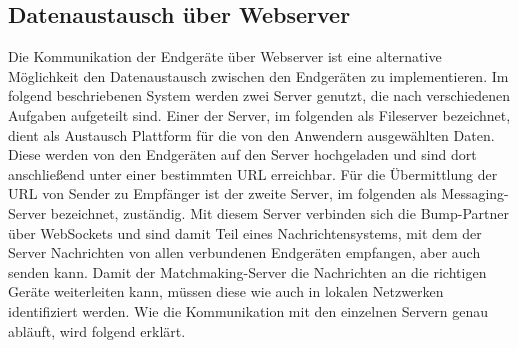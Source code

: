 \subsection{Datenaustausch über Webserver}
\label{sec:AustauschWebserver}

Die Kommunikation der Endgeräte über Webserver ist eine alternative Möglichkeit den Datenaustausch zwischen den Endgeräten zu implementieren. Im folgend beschriebenen System werden zwei Server genutzt, die nach verschiedenen Aufgaben aufgeteilt sind. Einer der Server, im folgenden als Fileserver bezeichnet, dient als Austausch Plattform für die von den Anwendern ausgewählten Daten. Diese werden von den Endgeräten auf den Server hochgeladen und sind dort anschließend unter einer bestimmten \acs{URL} erreichbar. Für die Übermittlung der \acs{URL} von Sender zu Empfänger ist der zweite Server, im folgenden als Messaging-Server bezeichnet, zuständig. Mit diesem Server verbinden sich die Bump-Partner über WebSockets und sind damit Teil eines Nachrichtensystems, mit dem der Server Nachrichten von allen verbundenen Endgeräten empfangen, aber auch senden kann. Damit der Matchmaking-Server die Nachrichten an die richtigen Geräte weiterleiten kann, müssen diese wie auch in lokalen Netzwerken identifiziert werden. Wie die Kommunikation mit den einzelnen Servern genau abläuft, wird folgend erklärt.

